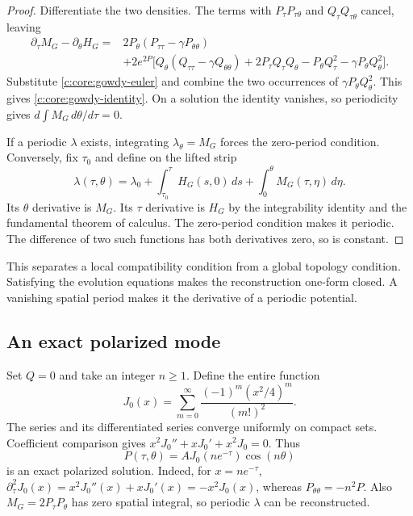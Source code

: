 \begin{proof}
Differentiate the two densities. The terms with $P_\tau
P_{\tau\theta}$ and $Q_\tau Q_{\tau\theta}$ cancel, leaving
\[
\begin{aligned}
 \partial_\tau M_G-\partial_\theta H_G
 ={}&2P_\theta(P_{\tau\tau}-\gamma P_{\theta\theta})\\
 &+2e^{2P}\big[
 Q_\theta(Q_{\tau\tau}-\gamma Q_{\theta\theta})
 +2P_\tau Q_\tau Q_\theta
 -P_\theta Q_\tau^2-\gamma P_\theta Q_\theta^2\big].
\end{aligned}
\]
Substitute \eqref{c:core:gowdy-euler} and combine the two occurrences of
$\gamma P_\theta Q_\theta^2$. This gives
\eqref{c:core:gowdy-identity}. On a solution the identity vanishes,
so periodicity gives $d\int M_G\,d\theta/d\tau=0$.

If a periodic $\lambda$ exists, integrating $\lambda_\theta=M_G$
forces the zero-period condition. Conversely, fix $\tau_0$ and define
on the lifted strip
\[
 \lambda(\tau,\theta)=\lambda_0
 +\int_{\tau_0}^{\tau}H_G(s,0)\,ds
 +\int_0^{\theta}M_G(\tau,\eta)\,d\eta.
\]
Its $\theta$ derivative is $M_G$. Its $\tau$ derivative is $H_G$ by
the integrability identity and the fundamental theorem of calculus.
The zero-period condition makes it periodic. The difference of two
such functions has both derivatives zero, so is constant.
\end{proof}

This separates a local compatibility condition from a global topology
condition. Satisfying the evolution equations makes the reconstruction
one-form closed. A vanishing spatial period makes it the derivative of
a periodic potential.

\subsection{An exact polarized mode}

Set $Q=0$ and take an integer $n\geq1$. Define the entire function
\[
 J_0(x)=\sum_{m=0}^{\infty}\frac{(-1)^m(x^2/4)^m}{(m!)^2}.
\]
The series and its differentiated series converge uniformly on compact
sets. Coefficient comparison gives
$x^2J_0''+xJ_0'+x^2J_0=0$. Thus
\begin{equation}
 P(\tau,\theta)=A J_0(ne^{-\tau})\cos(n\theta)
 \label{c:core:gowdy-mode}
\end{equation}
is an exact polarized solution. Indeed, for $x=ne^{-\tau}$,
$\partial_\tau^2J_0(x)=x^2J_0''(x)+xJ_0'(x)=-x^2J_0(x)$,
whereas $P_{\theta\theta}=-n^2P$. Also
$M_G=2P_\tau P_\theta$ has zero spatial integral, so periodic
$\lambda$ can be reconstructed.

